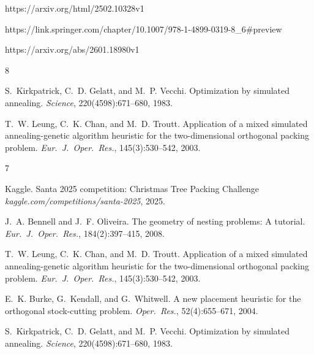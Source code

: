 https://arxiv.org/html/2502.10328v1

https://link.springer.com/chapter/10.1007/978-1-4899-0319-8_6#preview

https://arxiv.org/abs/2601.18980v1


\begin{thebibliography}{8}

S.~Kirkpatrick, C.~D. Gelatt, and M.~P. Vecchi.
Optimization by simulated annealing.
\textit{Science}, 220(4598):671--680, 1983.


T.~W. Leung, C.~K. Chan, and M.~D. Troutt.
Application of a mixed simulated annealing-genetic algorithm heuristic
for the two-dimensional orthogonal packing problem.
\textit{Eur.\ J.\ Oper.\ Res.}, 145(3):530--542, 2003.


\end{thebibliography}

\begin{thebibliography}{7}

            Kaggle.
            Santa 2025 competition: Christmas Tree Packing Challenge
\textit{kaggle.com/competitions/santa-2025}, 2025.


J.~A. Bennell and J.~F. Oliveira.
The geometry of nesting problems: A tutorial.
\textit{Eur.\ J.\ Oper.\ Res.}, 184(2):397--415, 2008.

T.~W. Leung, C.~K. Chan, and M.~D. Troutt.
Application of a mixed simulated annealing-genetic algorithm heuristic
for the two-dimensional orthogonal packing problem.
\textit{Eur.\ J.\ Oper.\ Res.}, 145(3):530--542, 2003.

E.~K. Burke, G.~Kendall, and G.~Whitwell.
A new placement heuristic for the orthogonal stock-cutting problem.
\textit{Oper.\ Res.}, 52(4):655--671, 2004.


S.~Kirkpatrick, C.~D. Gelatt, and M.~P. Vecchi.
Optimization by simulated annealing.
\textit{Science}, 220(4598):671--680, 1983.

\end{thebibliography}

